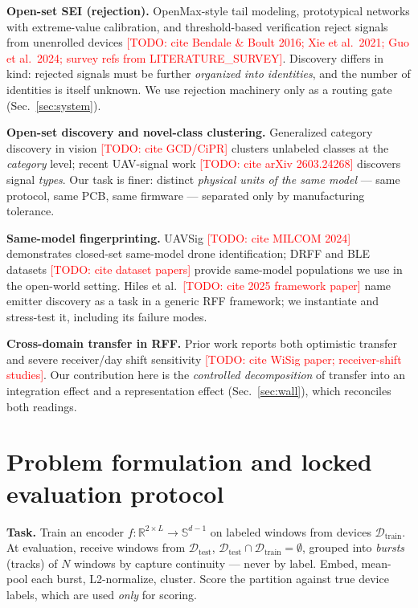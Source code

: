 \documentclass[conference]{IEEEtran}
\newcommand{\todo}[1]{\textcolor{red}{[TODO: #1]}}
\begin{document}
\textbf{Open-set SEI (rejection).} OpenMax-style tail modeling, prototypical networks with
extreme-value calibration, and threshold-based verification reject signals from unenrolled
devices \todo{cite Bendale \& Boult 2016; Xie et al.\ 2021; Guo et al.\ 2024; survey refs from
LITERATURE\_SURVEY}. Discovery differs in kind: rejected signals must be further \emph{organized
into identities}, and the number of identities is itself unknown. We use rejection machinery only
as a routing gate (Sec.~\ref{sec:system}).

\textbf{Open-set discovery and novel-class clustering.} Generalized category discovery in vision
\todo{cite GCD/CiPR} clusters unlabeled classes at the \emph{category} level; recent UAV-signal
work \todo{cite arXiv 2603.24268} discovers signal \emph{types}. Our task is finer: distinct
\emph{physical units of the same model} --- same protocol, same PCB, same firmware --- separated
only by manufacturing tolerance.

\textbf{Same-model fingerprinting.} UAVSig \todo{cite MILCOM 2024} demonstrates closed-set
same-model drone identification; DRFF and BLE datasets \todo{cite dataset papers} provide
same-model populations we use in the open-world setting. Hiles et al.\ \todo{cite 2025 framework
paper} name emitter discovery as a task in a generic RFF framework; we instantiate and
stress-test it, including its failure modes.

\textbf{Cross-domain transfer in RFF.} Prior work reports both optimistic transfer and severe
receiver/day shift sensitivity \todo{cite WiSig paper; receiver-shift studies}. Our contribution
here is the \emph{controlled decomposition} of transfer into an integration effect and a
representation effect (Sec.~\ref{sec:wall}), which reconciles both readings.

\section{Problem formulation and locked evaluation protocol}
\label{sec:protocol}

\textbf{Task.} Train an encoder $f:\mathbb{R}^{2\times L}\!\to\!\mathbb{S}^{d-1}$ on labeled
windows from devices $\mathcal{D}_{\mathrm{train}}$. At evaluation, receive windows from
$\mathcal{D}_{\mathrm{test}}$, $\mathcal{D}_{\mathrm{test}}\cap\mathcal{D}_{\mathrm{train}}
=\emptyset$, grouped into \emph{bursts} (tracks) of $N$ windows by capture continuity --- never by
label. Embed, mean-pool each burst, L2-normalize, cluster. Score the partition against true device
labels, which are used \emph{only} for scoring.
\end{document}
